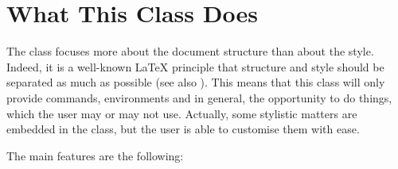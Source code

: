 \section{What This Class Does}

The  class focuses more about the document structure than 
about the style. Indeed, it is a well-known \LaTeX\xspace principle that 
structure and style should be separated as much as possible (see also 
). This means that this class will only provide 
commands, environments and in general, the opportunity to do things, 
which the user may or may not use. Actually, some stylistic matters are 
embedded in the class, but the user is able to customise them with ease.

The main features are the following:

